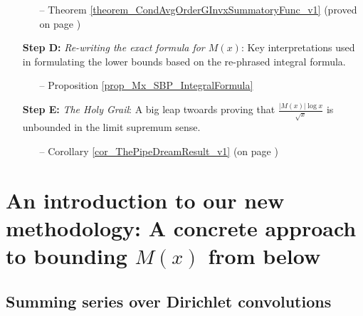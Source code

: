 \documentclass[11pt,reqno,a4letter]{article}
\numberwithin{figure}{section}
\numberwithin{table}{section}
\theoremstyle{plain}
\numberwithin{theorem}{section}
\theoremstyle{definition}
\begin{document}
\begin{itemize}[noitemsep,topsep=0pt]
\begin{itemize}[noitemsep,topsep=0pt]
     \item[--] \small{Theorem \ref{theorem_CondAvgOrderGInvxSummatoryFunc_v1} 
               (proved on page \pageref{proofOf_theorem_CondAvgOrderGInvxSummatoryFunc_v1})} 
     \end{itemize} 
\item[\textbf{Step D:}] \textit{Re-writing the exact formula for $M(x)$}: Key interpretations used in 
     formulating the lower bounds based on the re-phrased integral formula. 
     \begin{itemize}[noitemsep,topsep=0pt]
     \item[--] \small{Proposition \ref{prop_Mx_SBP_IntegralFormula}} 
     \end{itemize} 
\item[\textbf{Step E:}] \textit{The Holy Grail}: A big leap twoards proving that 
     $\frac{|M(x)| \log x}{\sqrt{x}}$ is 
     unbounded in the limit supremum sense. 
     \begin{itemize}[noitemsep,topsep=0pt]
     \item[--] \small{Corollary \ref{cor_ThePipeDreamResult_v1} (on page \pageref{proofOf_cor_ThePipeDreamResult_v1})} 
     \end{itemize} 

\end{itemize} 

\newpage 
\section{An introduction to our new methodology: A concrete approach to bounding $M(x)$ from below} 

\subsection{Summing series over Dirichlet convolutions} 
\end{document}
